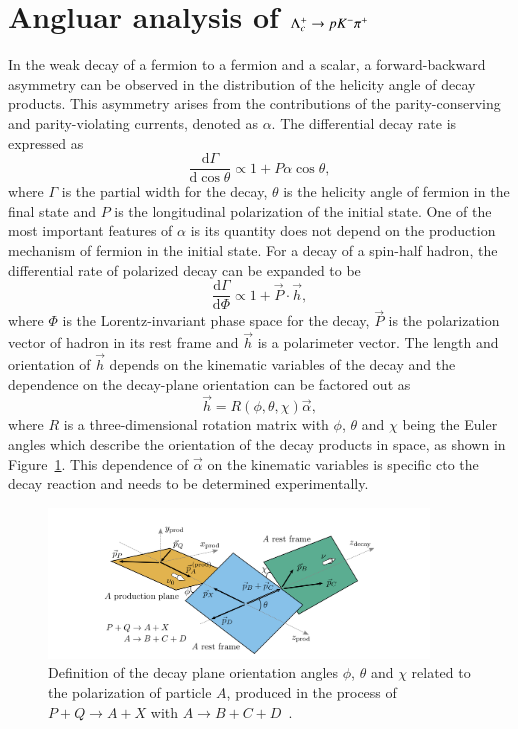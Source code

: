\clearpage
\section{Angluar analysis of $\Lambda_{c}^{+} \rightarrow p K^- \pi^+$}
\label{sec:angular}

In the weak decay of a fermion to a fermion and a scalar, a forward-backward asymmetry can be observed in the distribution of the helicity angle of decay products. This asymmetry arises from the contributions of the parity-conserving and parity-violating currents, denoted as $\alpha$. The differential decay rate is expressed as
\begin{equation}\label{eq:two-body-fermion}
    \frac{\mathrm{d}\Gamma}{\mathrm{d}\cos\theta} \varpropto 1 + P\alpha\cos\theta,
\end{equation}
where $\Gamma$ is the partial width for the decay, $\theta$ is the helicity angle of fermion in the final state and $P$ is the longitudinal polarization of the initial state. One of the most important features of $\alpha$ is its quantity does not depend on the production mechanism of fermion in the initial state. For a decay of a spin-half hadron, the differential rate of polarized decay can be expanded to be
\begin{equation}\label{eq:multi-body-hadron}
    \frac{\mathrm{d}\Gamma}{\mathrm{d}\Phi} \varpropto 1 + \vec{P}\cdot\vec{h},
\end{equation}
where $\Phi$ is the Lorentz-invariant phase space for the decay, $\vec{P}$ is the polarization vector of hadron in its rest frame and $\vec{h}$ is a polarimeter vector. The length and orientation of $\vec{h}$ depends on the kinematic variables of the decay and the dependence on the decay-plane orientation can be factored out as
\begin{equation}
    \vec{h} = R(\phi, \theta, \chi)\vec{\alpha}, 
\end{equation}
where $R$ is a three-dimensional rotation matrix with $\phi$, $\theta$ and $\chi$ being the Euler angles which describe the orientation of the decay products in space, as shown in Figure~\ref{fig:polar-angle}. This dependence of $\vec{\alpha}$ on the kinematic variables is specific cto the decay reaction and needs to be determined experimentally.
\begin{figure}[H]
    \centering
    \includegraphics[width=0.90\textwidth]{figure/polarimetery/LHCb/polarimeter_angle.png}
    \caption{Definition of the decay plane orientation angles $\phi$, $\theta$ and $\chi$ related to the polarization of particle $A$, produced in the process of $P + Q \to A + X$ with $A \to B + C +D$~\cite{LHCb:2023crj}.}
    \label{fig:polar-angle}
\end{figure}

